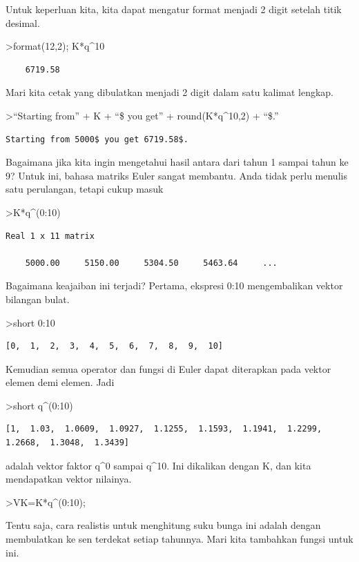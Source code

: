 \documentclass[
]{book}
\begin{document}
Untuk keperluan kita, kita dapat mengatur format menjadi 2 digit setelah titik desimal.

\textgreater format(12,2); K*q\^{}10

\begin{verbatim}
    6719.58 
\end{verbatim}

Mari kita cetak yang dibulatkan menjadi 2 digit dalam satu kalimat lengkap.

\textgreater{}``Starting from'' + K + ``\$ you get'' + round(K*q\^{}10,2) + ``\$.''

\begin{verbatim}
Starting from 5000$ you get 6719.58$.
\end{verbatim}

Bagaimana jika kita ingin mengetahui hasil antara dari tahun 1 sampai tahun ke 9? Untuk ini, bahasa matriks Euler sangat membantu. Anda tidak perlu menulis satu perulangan, tetapi cukup masuk

\textgreater K*q\^{}(0:10)

\begin{verbatim}
Real 1 x 11 matrix

    5000.00     5150.00     5304.50     5463.64     ...
\end{verbatim}

Bagaimana keajaiban ini terjadi? Pertama, ekspresi 0:10 mengembalikan vektor bilangan bulat.

\textgreater short 0:10

\begin{verbatim}
[0,  1,  2,  3,  4,  5,  6,  7,  8,  9,  10]
\end{verbatim}

Kemudian semua operator dan fungsi di Euler dapat diterapkan pada vektor elemen demi elemen. Jadi

\textgreater short q\^{}(0:10)

\begin{verbatim}
[1,  1.03,  1.0609,  1.0927,  1.1255,  1.1593,  1.1941,  1.2299,
1.2668,  1.3048,  1.3439]
\end{verbatim}

adalah vektor faktor q\^{}0 sampai q\^{}10. Ini dikalikan dengan K, dan kita mendapatkan vektor nilainya.

\textgreater VK=K*q\^{}(0:10);

Tentu saja, cara realistis untuk menghitung suku bunga ini adalah dengan membulatkan ke sen terdekat setiap tahunnya. Mari kita tambahkan fungsi untuk ini.
\end{document}
